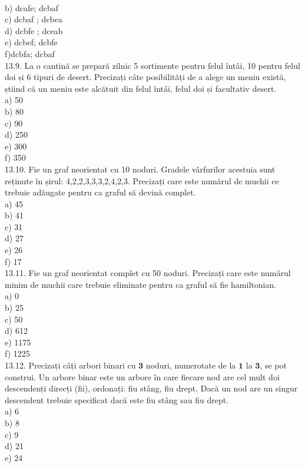 {{\\
b) dcafe; dcbaf
\\
c) dcbaf ; dcbea
\\
d) dcbfe ; dceab
\\
e) dcbef; dcbfe
\\
f)dcbfa; dcbaf
\\
13.9. La o cantină se prepară zilnic 5 sortimente pentru felul întâi, 10 pentru felul doi și 6 tipuri de desert. Precizați câte posibilități de a alege un meniu există, știind că un meniu este alcătuit din felul întâi, felul doi și facultativ desert.
\\
a) 50
\\
b) 80
\\
c) 90
\\
d) 250
\\
e) 300
\\
f) 350
\\
13.10. Fie un graf neorientat cu 10 noduri. Gradele vârfurilor acestuia sunt reținute în șirul: 4,2,2,3,3,3,2,4,2,3. Precizați care este numărul de muchii ce trebuie adăugate pentru ca graful să devină complet.
\\
a) 45
\\
b) 41
\\
c) 31
\\
d) 27
\\
e) 26
\\
f) 17
\\
13.11. Fie un graf neorientat complet cu 50 noduri. Precizați care este numărul minim de muchii care trebuie eliminate pentru ca graful să fie hamiltonian.
\\
a) 0
\\
b) 25
\\
c) 50
\\
d) 612
\\
e) 1175
\\
f) 1225
\\
13.12. Precizați câți arbori binari cu $\mathbf{3}$ noduri, numerotate de la $\mathbf{1}$ la $\mathbf{3}$, se pot construi. Un arbore binar este un arbore în care fiecare nod are cel mult doi descendenți direcți (fii), ordonați: fiu stâng, fiu drept. Dacă un nod are un singur descendent trebuie specificat dacă este fiu stâng sau fiu drept.
\\
a) 6
\\
b) 8
\\
c) 9
\\
d) 21
\\
e) 24
\\
}}
